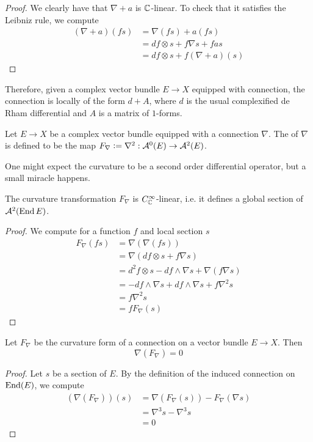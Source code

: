%
\begin{proof}
We clearly have that $\nabla + a$ is $\mathbb{C}$-linear. To check that it satisfies the
Leibniz rule, we compute
\begin{align*}
(\nabla + a)(fs) &= \nabla(fs) + a(fs) \\
&= df \otimes s + f\nabla s + fas \\
&= df \otimes s + f(\nabla + a)(s)
\end{align*}
\end{proof}
%
Therefore, given a complex vector bundle $E \to X$ equipped with connection, the
connection is locally of the form $d + A$, where $d$ is the usual complexified
de Rham differential and $A$ is a matrix of $1$-forms.
%
\begin{defn}
Let $E \to X$ be a complex vector bundle equipped with a connection $\nabla$.
The  of $\nabla$ is defined to be the map
$F_{\nabla} \vcentcolon= \nabla^2 : \mathcal{A}^0(E) \to \mathcal{A}^2(E)$.
\end{defn}
%
One might expect the curvature to be a second order differential operator, but a
small miracle happens.
%
\begin{prop}
The curvature transformation $F_\nabla$ is $C^\infty_{\mathbb{C}}$-linear, i.e. it defines
a global section of $\mathcal{A}^2(\operatorname{End} E)$.
\end{prop}
%
\begin{proof}
We compute for a function $f$ and local section $s$
\begin{align*}
F_\nabla(fs) &= \nabla(\nabla(fs)) \\
&= \nabla(df \otimes s + f\nabla s) \\
&= d^2f \otimes s - df \wedge \nabla s + \nabla(f\nabla s) \\
&= -df \wedge \nabla s + df \wedge \nabla s + f\nabla^2 s \\
&= f\nabla^2 s \\
&= fF_\nabla(s)
\end{align*}
\end{proof}
%
\begin{thm}
Let $F_\nabla$ be the curvature form of a connection on a vector bundle $E \to X$.
Then
\[
\nabla(F_\nabla) = 0
\]
\end{thm}
%
\begin{proof}
Let $s$ be a section of $E$. By the definition of the induced connection on $\operatorname{End}(E)$, we
compute
\begin{align*}
(\nabla(F_\nabla))(s) &= \nabla(F_\nabla(s)) - F_\nabla(\nabla s) \\
&= \nabla^3s - \nabla^3s \\
&= 0
\end{align*}
\end{proof}
